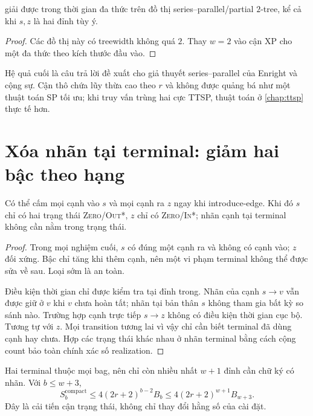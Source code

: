 \begin{corollary}
\TP{} giải được trong thời gian đa thức trên đồ thị series--parallel/partial $2$-tree, kể cả khi $s,z$ là hai đỉnh tùy ý.
\end{corollary}

\begin{proof}
Các đồ thị này có treewidth không quá $2$. Thay $w=2$ vào cận XP cho một đa thức theo kích thước đầu vào.
\end{proof}

Hệ quả cuối là câu trả lời đề xuất cho giả thuyết series--parallel của Enright và cộng sự. Cận thô chứa lũy thừa cao theo $r$ và không được quảng bá như một thuật toán SP tối ưu; khi truy vấn trùng hai cực TTSP, thuật toán ở \cref{chap:ttsp} thực tế hơn.

\section{Xóa nhãn tại terminal: giảm hai bậc theo hạng}

\begin{lemma}
\label{lem:terminal-compaction}
Có thể cấm mọi cạnh vào $s$ và mọi cạnh ra $z$ ngay khi introduce-edge. Khi đó $s$ chỉ có hai trạng thái \textsc{Zero}/\textsc{Out*}, $z$ chỉ có \textsc{Zero}/\textsc{In*}; nhãn cạnh tại terminal không cần nằm trong trạng thái.
\end{lemma}

\begin{proof}
Trong mọi nghiệm cuối, $s$ có đúng một cạnh ra và không có cạnh vào; $z$ đối xứng. Bậc chỉ tăng khi thêm cạnh, nên một vi phạm terminal không thể được sửa về sau. Loại sớm là an toàn.

Điều kiện thời gian chỉ được kiểm tra tại đỉnh trong. Nhãn của cạnh $s\to v$ vẫn được giữ ở $v$ khi $v$ chưa hoàn tất; nhãn tại bản thân $s$ không tham gia bất kỳ so sánh nào. Trường hợp cạnh trực tiếp $s\to z$ không có điều kiện thời gian cục bộ. Tương tự với $z$. Mọi transition tương lai vì vậy chỉ cần biết terminal đã dùng cạnh hay chưa. Hợp các trạng thái khác nhau ở nhãn terminal bằng cách cộng count bảo toàn chính xác số realization.
\end{proof}

Hai terminal thuộc mọi bag, nên chỉ còn nhiều nhất $w+1$ đỉnh cần chữ ký có nhãn. Với $b\le w+3$,
\[
 S_b^{\mathrm{compact}}\le4(2r+2)^{b-2}B_b
 \le4(2r+2)^{w+1}B_{w+3}.
\]
Đây là cải tiến cận trạng thái, không chỉ thay đổi hằng số của cài đặt.

